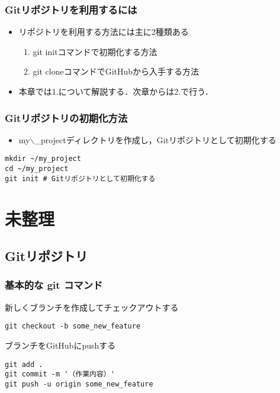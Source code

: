 \documentclass{bxjsarticle}
\begin{document}
\subsubsection{Gitリポジトリを利用するには}
\label{sec-2-1-2}
\begin{itemize}
\item リポジトリを利用する方法には主に2種類ある
\begin{enumerate}
\item git initコマンドで初期化する方法
\item git cloneコマンドでGitHubから入手する方法
\end{enumerate}
\item 本章では1.について解説する．次章からは2.で行う．
\end{itemize}

\subsubsection{Gitリポジトリの初期化方法}
\label{sec-2-1-3}
\begin{itemize}
\item my$\backslash$\_projectディレクトリを作成し，Gitリポジトリとして初期化する
\end{itemize}

\begin{verbatim}
mkdir ~/my_project
cd ~/my_project
git init # Gitリポジトリとして初期化する
\end{verbatim}


\section{未整理}
\label{sec-3}
\subsection{Gitリポジトリ}
\label{sec-3-1}
\subsubsection{基本的な git コマンド}
\label{sec-3-1-1}
新しくブランチを作成してチェックアウトする

\begin{verbatim}
git checkout -b some_new_feature
\end{verbatim}

ブランチをGitHubにpushする

\begin{verbatim}
git add .
git commit -m '（作業内容）'
git push -u origin some_new_feature
\end{verbatim}
\end{document}
